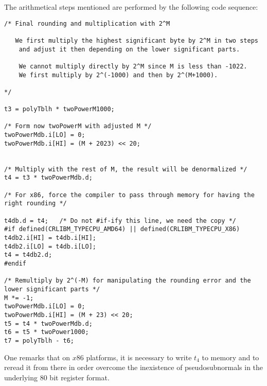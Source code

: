 The arithmetical steps mentioned are performed by the following code sequence:
\begin{lstlisting}[caption={Underflowed final multiplication and rounding},firstnumber=1]
/* Final rounding and multiplication with 2^M 

   We first multiply the highest significant byte by 2^M in two steps
	and adjust it then depending on the lower significant parts.

	We cannot multiply directly by 2^M since M is less than -1022.
	We first multiply by 2^(-1000) and then by 2^(M+1000).

*/

t3 = polyTblh * twoPowerM1000;

/* Form now twoPowerM with adjusted M */
twoPowerMdb.i[LO] = 0;
twoPowerMdb.i[HI] = (M + 2023) << 20;


/* Multiply with the rest of M, the result will be denormalized */
t4 = t3 * twoPowerMdb.d;

/* For x86, force the compiler to pass through memory for having the right rounding */

t4db.d = t4;   /* Do not #if-ify this line, we need the copy */
#if defined(CRLIBM_TYPECPU_AMD64) || defined(CRLIBM_TYPECPU_X86) 
t4db2.i[HI] = t4db.i[HI];
t4db2.i[LO] = t4db.i[LO];
t4 = t4db2.d;
#endif

/* Remultiply by 2^(-M) for manipulating the rounding error and the lower significant parts */
M *= -1;
twoPowerMdb.i[LO] = 0;
twoPowerMdb.i[HI] = (M + 23) << 20;
t5 = t4 * twoPowerMdb.d;
t6 = t5 * twoPower1000;
t7 = polyTblh - t6;
\end{lstlisting}
One remarks that on $x86$ platforms, it is necessary to write $t_4$ to
memory and to reread it from there in order overcome the inexistence
of pseudosubnormals in the underlying $80$ bit register format.


